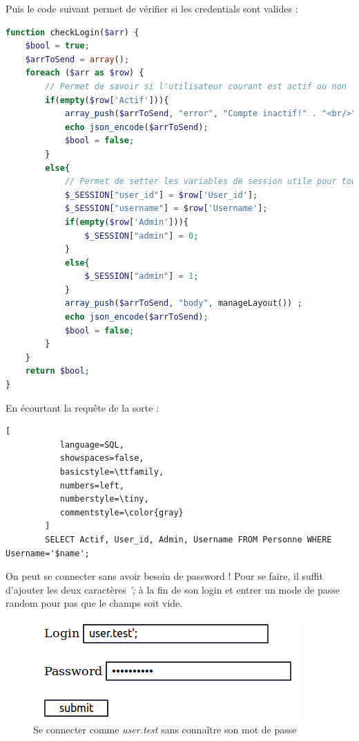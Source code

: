 \documentclass[12pt]{article}
\begin{document}
Puis le code suivant permet de vérifier si les credentials sont valides : 

\begin{lstlisting}[language=PHP]
function checkLogin($arr) {
    $bool = true;
    $arrToSend = array();
    foreach ($arr as $row) {
        // Permet de savoir si l'utilisateur courant est actif ou non
        if(empty($row['Actif'])){
            array_push($arrToSend, "error", "Compte inactif!" . "<br/>") ;
            echo json_encode($arrToSend);
            $bool = false;
        }
        else{
            // Permet de setter les variables de session utile pour toute la connection
            $_SESSION["user_id"] = $row['User_id'];
            $_SESSION["username"] = $row['Username'];
            if(empty($row['Admin'])){
                $_SESSION["admin"] = 0;
            }
            else{
                $_SESSION["admin"] = 1;
            }
            array_push($arrToSend, "body", manageLayout()) ;
            echo json_encode($arrToSend);
            $bool = false;
        }
    }
    return $bool;
}
\end{lstlisting}

En écourtant la requête de la sorte : 

\begin{lstlisting}[
           language=SQL,
           showspaces=false,
           basicstyle=\ttfamily,
           numbers=left,
           numberstyle=\tiny,
           commentstyle=\color{gray}
        ]
        SELECT Actif, User_id, Admin, Username FROM Personne WHERE Username='$name';
\end{lstlisting}

On peut se connecter sans avoir besoin de password ! Pour se faire, il suffit d'ajouter les deux caractères \textit{';} à la fin de son login et entrer un mode de passe random pour pas que le champs soit vide.

\begin{figure}[H]
\centering
\includegraphics[width=\linewidth]{images/sqliLogin.png}
\caption{Se connecter comme \textit{user.test} sans connaître son mot de passe}
\end{figure}
\end{document}
